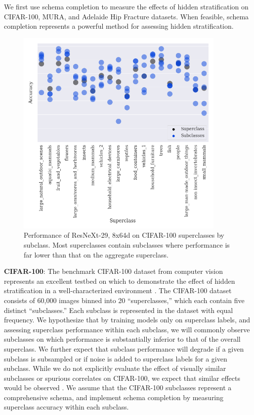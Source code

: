 \documentclass{article}
\begin{document}
We first use schema completion to measure the effects of hidden stratification on CIFAR-100, MURA, and Adelaide Hip Fracture datasets.
When feasible, schema completion represents a powerful method for assessing hidden stratification.

 \begin{figure}[htb!]
 \centering
\includegraphics[width=4in]{Superclass-Subclass-CIFAR-100-Correct-Val-v3.png}
\caption{Performance of ResNeXt-29, 8x64d on CIFAR-100 superclasses by subclass.  Most superclasses contain subclasses where performance is far lower than that on the aggregate superclass.}
\label{fig:cifar}
\end{figure}

\textbf{CIFAR-100}: The benchmark CIFAR-100 dataset from computer vision represents an excellent testbed on which to demonstrate the effect of hidden stratification in a well-characterized environment \citep{Krizhevsky2009-tq}.  
The CIFAR-100 dataset consists of 60,000 images binned into 20 ``superclasses,'' which each contain five distinct ``subclasses.'' 
 Each subclass is represented in the dataset with equal frequency.  
 We hypothesize that by training models only on superclass labels, and assessing superclass performance within each subclass, we will commonly observe subclasses on which performance is substantially inferior to that of the overall superclass.  
  We further expect that subclass performance will degrade if a given subclass is subsampled or if noise is added to superclass labels for a given subclass.  
 While we do not explicitly evaluate the effect of visually similar subclasses or spurious correlates on CIFAR-100, we expect that similar effects would be observed \citep{Selbst2017-gz}.  
 We assume that the CIFAR-100 subclasses represent a comprehensive schema, and implement schema completion by measuring superclass accuracy within each subclass.
 
\end{document}
